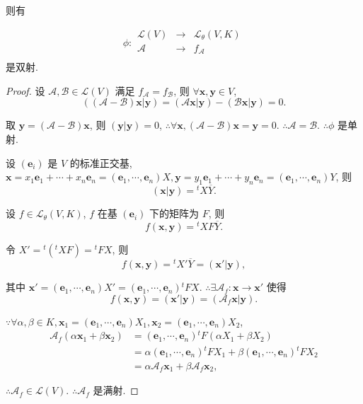 \documentclass{ctexart}
\begin{document}
则有
\begin{theorem}\label{t3.1}
    \[\phi:\begin{array}{rcl}
        \mathcal{L}(V) & \to & \mathcal{L}_\theta(V,K) \\
        \mathcal{A} & \to & f_\mathcal{A} \\
    \end{array}\]
    是双射.
\end{theorem}
\begin{proof}
    设 $\mathcal{A},\mathcal{B}\in\mathcal{L}(V)$ 满足 $f_\mathcal{A}=f_\mathcal{B}$, 则 $\forall\boldsymbol{x},\boldsymbol{y}\in V$,
    \[((\mathcal{A}-\mathcal{B})\boldsymbol{x}|\boldsymbol{y})=(\mathcal{A}\boldsymbol{x}|\boldsymbol{y})-(\mathcal{B}\boldsymbol{x}|\boldsymbol{y})=0.\]

    取 $\boldsymbol{y}=(\mathcal{A}-\mathcal{B})\boldsymbol{x}$, 则 $(\boldsymbol{y}|\boldsymbol{y})=0$, $\therefore\forall\boldsymbol{x},(\mathcal{A}-\mathcal{B})\boldsymbol{x}=\boldsymbol{y}=0$. $\therefore\mathcal{A}=\mathcal{B}$. $\therefore\phi$ 是单射.

    设 $(\boldsymbol{e}_i)$ 是 $V$ 的标准正交基, $\boldsymbol{x}=x_1\boldsymbol{e}_1+\cdots+x_n\boldsymbol{e}_n=(\boldsymbol{e}_1,\cdots,\boldsymbol{e}_n)X,\boldsymbol{y}=y_1\boldsymbol{e}_1+\cdots+y_n\boldsymbol{e}_n=(\boldsymbol{e}_1,\cdots,\boldsymbol{e}_n)Y$, 则
    \[(\boldsymbol{x}|\boldsymbol{y})={}^tX\overline{Y}.\]

    设 $f\in\mathcal{L}_\theta(V,K)$, $f$ 在基 $(\boldsymbol{e}_i)$ 下的矩阵为 $F$, 则
    \begin{equation}\label{eq3.1}
        f(\boldsymbol{x},\boldsymbol{y})={}^tXF\overline{Y}.
    \end{equation}

    令 $X'={}^t({}^tXF)={}^tFX$, 则
    \[f(\boldsymbol{x},\boldsymbol{y})={}^tX'\overline{Y}=(\boldsymbol{x}'|\boldsymbol{y}),\]

    其中 $\boldsymbol{x}'=(\boldsymbol{e}_1,\cdots,\boldsymbol{e}_n)X'=(\boldsymbol{e}_1,\cdots,\boldsymbol{e}_n){}^tFX$. $\therefore\exists\mathcal{A}_f:\boldsymbol{x}\to\boldsymbol{x}'$ 使得
    \begin{equation}\label{eq3.2}
        f(\boldsymbol{x},\boldsymbol{y})=(\boldsymbol{x}'|\boldsymbol{y})=(\mathcal{A}_f\boldsymbol{x}|\boldsymbol{y}).
    \end{equation}

    $\because\forall\alpha,\beta\in K,\boldsymbol{x}_1=(\boldsymbol{e}_1,\cdots,\boldsymbol{e}_n)X_1,\boldsymbol{x}_2=(\boldsymbol{e}_1,\cdots,\boldsymbol{e}_n)X_2$,
    \begin{align*}
        \mathcal{A}_f(\alpha\boldsymbol{x}_1+\beta\boldsymbol{x}_2) & =(\boldsymbol{e}_1,\cdots,\boldsymbol{e}_n){}^tF(\alpha X_1+\beta X_2) \\
        & =\alpha(\boldsymbol{e}_1,\cdots,\boldsymbol{e}_n){}^tFX_1+\beta(\boldsymbol{e}_1,\cdots,\boldsymbol{e}_n){}^tFX_2 \\
        & =\alpha\mathcal{A}_f\boldsymbol{x}_1+\beta\mathcal{A}_f\boldsymbol{x}_2,
    \end{align*}

    $\therefore\mathcal{A}_f\in\mathcal{L}(V)$. $\therefore\mathcal{A}_f$ 是满射.
\end{proof}
\end{document}
